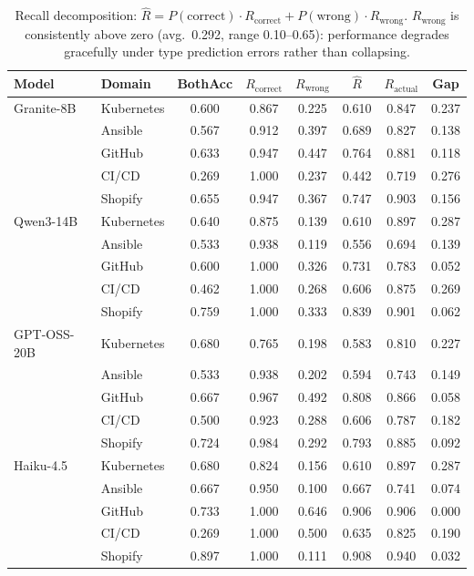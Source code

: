 \begin{table}[t]
\centering
\small
\begin{tabular}{ll cccc cc}
\toprule
\textbf{Model} & \textbf{Domain} & BothAcc & $R_{\text{correct}}$ & $R_{\text{wrong}}$ & $\hat{R}$ & $R_{\text{actual}}$ & Gap \\
\midrule
Granite-8B & Kubernetes & 0.600 & 0.867 & 0.225 & 0.610 & 0.847 & 0.237 \\
 & Ansible & 0.567 & 0.912 & 0.397 & 0.689 & 0.827 & 0.138 \\
 & GitHub & 0.633 & 0.947 & 0.447 & 0.764 & 0.881 & 0.118 \\
 & CI/CD & 0.269 & 1.000 & 0.237 & 0.442 & 0.719 & 0.276 \\
 & Shopify & 0.655 & 0.947 & 0.367 & 0.747 & 0.903 & 0.156 \\
\midrule
Qwen3-14B & Kubernetes & 0.640 & 0.875 & 0.139 & 0.610 & 0.897 & 0.287 \\
 & Ansible & 0.533 & 0.938 & 0.119 & 0.556 & 0.694 & 0.139 \\
 & GitHub & 0.600 & 1.000 & 0.326 & 0.731 & 0.783 & 0.052 \\
 & CI/CD & 0.462 & 1.000 & 0.268 & 0.606 & 0.875 & 0.269 \\
 & Shopify & 0.759 & 1.000 & 0.333 & 0.839 & 0.901 & 0.062 \\
\midrule
GPT-OSS-20B & Kubernetes & 0.680 & 0.765 & 0.198 & 0.583 & 0.810 & 0.227 \\
 & Ansible & 0.533 & 0.938 & 0.202 & 0.594 & 0.743 & 0.149 \\
 & GitHub & 0.667 & 0.967 & 0.492 & 0.808 & 0.866 & 0.058 \\
 & CI/CD & 0.500 & 0.923 & 0.288 & 0.606 & 0.787 & 0.182 \\
 & Shopify & 0.724 & 0.984 & 0.292 & 0.793 & 0.885 & 0.092 \\
\midrule
Haiku-4.5 & Kubernetes & 0.680 & 0.824 & 0.156 & 0.610 & 0.897 & 0.287 \\
 & Ansible & 0.667 & 0.950 & 0.100 & 0.667 & 0.741 & 0.074 \\
 & GitHub & 0.733 & 1.000 & 0.646 & 0.906 & 0.906 & 0.000 \\
 & CI/CD & 0.269 & 1.000 & 0.500 & 0.635 & 0.825 & 0.190 \\
 & Shopify & 0.897 & 1.000 & 0.111 & 0.908 & 0.940 & 0.032 \\
\bottomrule
\end{tabular}
\caption{Recall decomposition: $\hat{R} = P(\text{correct}) \cdot R_{\text{correct}} + P(\text{wrong}) \cdot R_{\text{wrong}}$. $R_{\text{wrong}}$ is consistently above zero (avg.\ 0.292, range 0.10--0.65): performance degrades gracefully under type prediction errors rather than collapsing.}
\label{tab:recall-decomposition}
\end{table}
